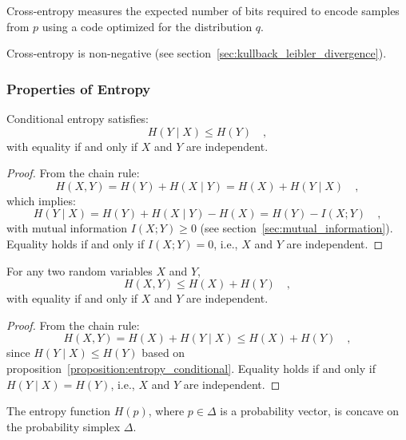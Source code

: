 \documentclass[../../main.tex]{subfiles}
\begin{document}
\begin{remark}
    Cross-entropy measures the expected number of bits required to encode samples from \( p \) using a code optimized for the distribution \( q \).
\end{remark}

\begin{remark}
    Cross-entropy is non-negative (see section~\ref{sec:kullback_leibler_divergence}).
\end{remark}

\smallskip
\subsubsection{Properties of Entropy}

\begin{proposition}
    \label{proposition:entropy_conditional}
    Conditional entropy satisfies:
    \[
        H(Y \mid X) \leq H(Y) \quad ,
    \]
    with equality if and only if \( X \) and \( Y \) are independent.
\end{proposition}
\vspace{-2.5em}
\begin{proof}
    From the chain rule:
    \[
        H(X, Y) = H(Y) + H(X \mid Y) = H(X) + H(Y \mid X) \quad ,
    \]
    which implies:
    \[
        H(Y \mid X) = H(Y) + H(X \mid Y) - H(X) = H(Y) - I(X; Y) \quad ,
    \]
    with mutual information \( I(X; Y) \geq 0 \) (see section~\ref{sec:mutual_information}). Equality holds if and only if \( I(X; Y) = 0 \), i.e., \( X \) and \( Y \) are independent.
\end{proof}

\medskip
\begin{corollary}
    For any two random variables \( X \) and \( Y \),
    \[
        H(X, Y) \leq H(X) + H(Y) \quad ,
    \]
    with equality if and only if \( X \) and \( Y \) are independent.
\end{corollary}
\vspace{-2.5em}
\begin{proof}
    From the chain rule:
    \[
        H(X, Y) = H(X) + H(Y \mid X) \leq H(X) + H(Y) \quad ,
    \]
    since \( H(Y \mid X) \leq H(Y) \) based on proposition~\ref{proposition:entropy_conditional}. Equality holds if and only if \( H(Y \mid X) = H(Y) \), i.e., \( X \) and \( Y \) are independent.
\end{proof}

\medskip
\begin{theorem}
The entropy function \( H(p) \), where \( p \in \Delta \) is a probability vector, is concave on the probability simplex $\Delta$.
\end{theorem}
\end{document}
